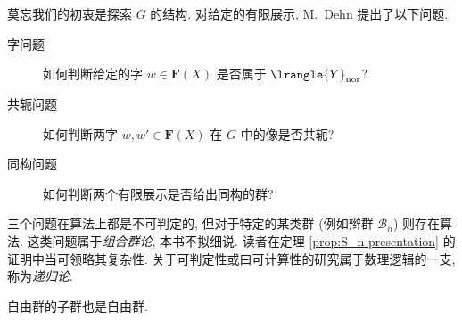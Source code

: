 莫忘我们的初衷是探索 $G$ 的结构. 对给定的有限展示, M.\ Dehn \cite{De11} 提出了以下问题.
\begin{description}
	\item[字问题] 如何判断给定的字 $w \in \mathbf{F}(X)$ 是否属于 $\lrangle{Y}_{\mathrm{nor}}$?
	\item[共轭问题] 如何判断两字 $w, w' \in \mathbf{F}(X)$ 在 $G$ 中的像是否共轭?
	\item[同构问题] 如何判断两个有限展示是否给出同构的群?
\end{description}
三个问题在算法上都是不可判定的, 但对于特定的某类群 (例如辫群 $\mathcal{B}_n$) 则存在算法. 这类问题属于\emph{组合群论}, 本书不拟细说. 读者在定理 \ref{prop:S_n-presentation} 的证明中当可领略其复杂性. 关于可判定性或曰可计算性的研究属于数理逻辑的一支, 称为\emph{递归论}.

\begin{theorem}
	自由群的子群也是自由群.
\end{theorem}
